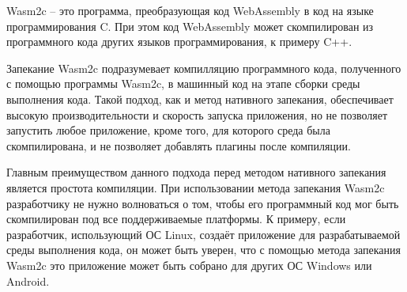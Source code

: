 Wasm2c -- это программа, преобразующая код WebAssembly в код на языке программирования C.
При этом код WebAssembly может скомпилирован из программного кода других языков программирования, к примеру C++.

Запекание Wasm2c подразумевает компилляцию программного кода, полученного с помощью программы Wasm2c, в машинный код на этапе сборки среды выполнения кода.
Такой подход, как и метод нативного запекания, обеспечивает высокую производительности и скорость запуска приложения, но не позволяет запустить любое приложение, кроме того, для которого среда была скомпилирована, и не позволяет добавлять плагины после компиляции.

Главным преимуществом данного подхода перед методом нативного запекания является простота компиляции.
При использовании метода запекания Wasm2c разработчику не нужно волноваться о том, чтобы его программный код мог быть скомпилирован под все поддерживаемые платформы.
К примеру, если разработчик, использующий ОС Linux, создаёт приложение для разрабатываемой среды выполнения кода, он может быть уверен, что с помощью метода запекания Wasm2c это приложение может быть собрано для других ОС Windows или Android.
